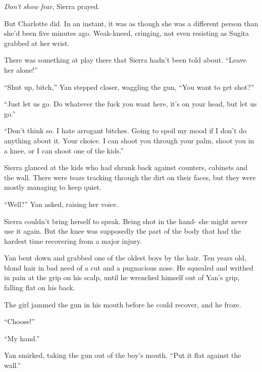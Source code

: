 \emph{Don't show fear}, Sierra prayed.



But Charlotte did.  In an instant, it was as though she was a different person than she'd been five minutes ago.  Weak-kneed, cringing, not even resisting as Sugita grabbed at her wrist.



There was something at play there that Sierra hadn't been told about.  ``Leave her alone!''



``Shut up, bitch,'' Yan stepped closer, waggling the gun, ``You want to get shot?''



``Just let us go.  Do whatever the fuck you want here, it's on your head, but let us go.''



``Don't think so.  I hate arrogant bitches.  Going to spoil my mood if I don't do anything about it.  Your choice.  I can shoot you through your palm, shoot you in a knee, or I can shoot one of the kids.''



Sierra glanced at the kids who had shrunk back against counters, cabinets and the wall.  There were tears tracking through the dirt on their faces, but they were mostly managing to keep quiet.



``Well?'' Yan asked, raising her voice.



Sierra couldn't bring herself to speak.  Being shot in the hand- she might never use it again.  But the knee was supposedly the part of the body that had the hardest time recovering from a major injury.



Yan bent down and grabbed one of the oldest boys by the hair.  Ten years old, blond hair in bad need of a cut and a pugnacious nose.  He squealed and writhed in pain at the grip on his scalp, until he wrenched himself out of Yan's grip, falling flat on his back.



The girl jammed the gun in his mouth before he could recover, and he froze.



``Choose!''



``My hand.''



Yan smirked, taking the gun out of the boy's mouth.  ``Put it flat against the wall.''



